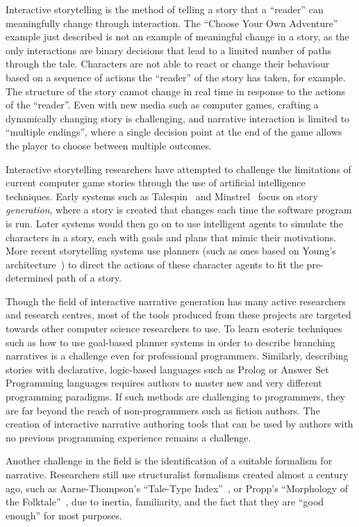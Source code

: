 \documentclass[11pt]{report}
\begin{document}
Interactive storytelling is the method of telling a story
that a ``reader'' can meaningfully change through interaction. The ``Choose Your
Own Adventure'' example just described is not an example of meaningful change in
a story, as the only interactions are binary decisions that lead to a limited
number of paths through the tale. Characters are not able to react or change
their behaviour based on a sequence of actions the ``reader'' of the story has
taken, for example. The structure of the story cannot change in real time in
response to the
actions of the ``reader''. Even with new media such as computer games, crafting
a dynamically changing story is challenging, and narrative interaction is
limited to ``multiple endings'', where a single decision point at the end of the
game allows the player to choose between multiple outcomes.

Interactive storytelling researchers have attempted to challenge the limitations
of current computer game stories through the use of artificial intelligence
techniques. Early systems such as Talespin~\citep{meehan1977tale} and
Minstrel~\citep{turner1993minstrel} focus on story \emph{generation}, where a
story is created that changes each time the software program is run. Later
systems would then go on to use intelligent agents to simulate the characters
in a story, each with goals and plans that mimic their motivations. More recent
storytelling systems use planners (such as ones based on Young's
architecture~\citep{young2004architecture}) to direct the actions of these
character agents to fit the pre-determined path of a story.

Though the field of interactive narrative generation has many active researchers
and research centres, most of the tools produced from these projects are
targeted towards other computer science researchers to use. To learn esoteric
techniques such as how to use goal-based planner systems in order to describe
branching narratives is a challenge even for professional programmers.
Similarly, describing stories with declarative, logic-based languages such as
Prolog or Answer Set Programming languages requires authors to master new and
very different programming paradigms. If such methods are challenging to
programmers, they are far beyond the reach of non-programmers such as fiction
authors. The creation of interactive narrative authoring tools that can be used
by authors with no previous programming experience remains a challenge.

Another challenge in the field is the identification of a suitable formalism for
narrative. Researchers still use structuralist formalisms created almost a
century ago, such as Aarne-Thompson's ``Tale-Type
Index''~\citep{aarne1987types}, or Propp's ``Morphology of the
Folktale''~\citep{propp1968morphology}, due to inertia, familiarity, and the fact
that they are ``good enough'' for most purposes.
\end{document}
